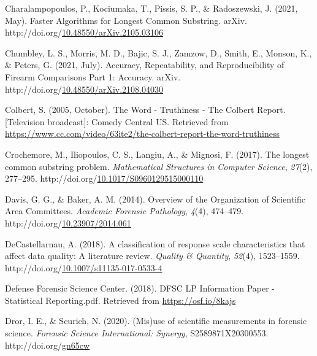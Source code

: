 \documentclass[print]{nuthesis}
\newlength{\cslhangindent}
\newenvironment{CSLReferences}[2]%
{\setlength{\parindent}{0pt}%
\everypar{\setlength{\hangindent}{\cslhangindent}}\ignorespaces}%
{\par}
\begin{document}
\begin{CSLReferences}{1}{0}
\leavevmode{}%
Charalampopoulos, P., Kociumaka, T., Pissis, S. P., \& Radoszewski, J. (2021, May). Faster {Algorithms} for {Longest} {Common} {Substring}. arXiv. http://doi.org/\href{https://doi.org/10.48550/arXiv.2105.03106}{10.48550/arXiv.2105.03106}

\leavevmode{}%
Chumbley, L. S., Morris, M. D., Bajic, S. J., Zamzow, D., Smith, E., Monson, K., \& Peters, G. (2021, July). Accuracy, {Repeatability}, and {Reproducibility} of {Firearm} {Comparisons} {Part} 1: {Accuracy}. arXiv. http://doi.org/\href{https://doi.org/10.48550/arXiv.2108.04030}{10.48550/arXiv.2108.04030}

\leavevmode{}%
Colbert, S. (2005, October). The {Word} - {Truthiness} - {The} {Colbert} {Report}. {[}Television broadcast{]}: {Comedy Central US}. Retrieved from \url{https://www.cc.com/video/63ite2/the-colbert-report-the-word-truthiness}

\leavevmode{}%
Crochemore, M., Iliopoulos, C. S., Langiu, A., \& Mignosi, F. (2017). The longest common substring problem. \emph{Mathematical Structures in Computer Science}, \emph{27}(2), 277--295. http://doi.org/\href{https://doi.org/10.1017/S0960129515000110}{10.1017/S0960129515000110}

\leavevmode{}%
Davis, G. G., \& Baker, A. M. (2014). Overview of the {Organization} of {Scientific} {Area} {Committees}. \emph{Academic Forensic Pathology}, \emph{4}(4), 474--479. http://doi.org/\href{https://doi.org/10.23907/2014.061}{10.23907/2014.061}

\leavevmode{}%
DeCastellarnau, A. (2018). A classification of response scale characteristics that affect data quality: A literature review. \emph{Quality \& Quantity}, \emph{52}(4), 1523--1559. http://doi.org/\href{https://doi.org/10.1007/s11135-017-0533-4}{10.1007/s11135-017-0533-4}

\leavevmode{}%
Defense Forensic Science Center. (2018). {DFSC} {LP} {Information} {Paper} - {Statistical} {Reporting}.pdf. Retrieved from \url{https://osf.io/8kajs}

\leavevmode{}%
Dror, I. E., \& Scurich, N. (2020). ({Mis})use of scientific measurements in forensic science. \emph{Forensic Science International: Synergy}, S2589871X20300553. http://doi.org/\href{https://doi.org/gn65cw}{gn65cw}


\end{CSLReferences}
\end{document}
